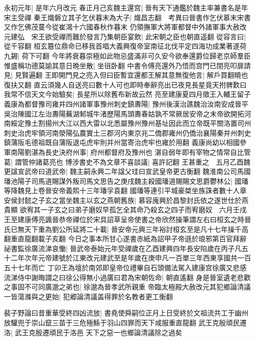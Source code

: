 永初元年|{
	是年六月改元}
春正月己亥魏主還宫|{
	晉有天下通鑑於魏主率兼書名是年宋主受禪}
秦王熾磐立其子乞伏暮末為大子|{
	熾昌志翻　考異曰晉書作乞伏慕末宋書又作乞佛茂蔓今從崔鴻十六國春秋作暮末}
仍領撫軍大將軍都督中外諸軍事大赦改元建弘　宋王欲受禪而難於發言乃集朝臣宴飲|{
	此宋朝之臣也朝直遥翻}
從容言曰|{
	從千容翻}
桓玄簒位鼎命已移我首唱大義興復帝室南征北伐平定四海功成業著遂荷九錫|{
	荷下可翻}
今年將衰暮崇極如此物忌盛滿非可久安今欲奉還爵位歸老京師羣臣惟盛稱功德莫諭其意日晩坐散|{
	坐徂卧翻}
中書令傅亮還外乃悟而宫門已閉亮叩扉請見|{
	見賢遍翻}
王即開門見之亮入但曰臣暫宜還都王解其意無復他言|{
	解戶買翻曉也復扶又翻}
直云須幾人自送亮曰數十人可也即時奉辭亮出已夜見長星竟天拊髀歎曰我常不信天文今始驗矣|{
	長星所以除舊布新故云然}
亮至建康夏四月徵王入輔王留子義康為都督豫司雍并四州諸軍事豫州刺史鎮夀陽|{
	豫州後漢治譙魏治汝南安成晉平吳治陳國江左治夀陽蕪湖邾城牛渚歷陽馬頭夀春姑孰不常厥居安帝之末帝欲開拓河南綏定豫土割揚州大江以西大雷以北悉屬豫州豫州基址因此而立帝既平關洛置司州刺史治虎牢領河南滎陽弘農實土三郡河内東京兆二僑郡雍州仍僑治襄陽秦并州刺史鎮蒲阪毛德祖既自蒲阪退屯虎牢則并州當寄治虎牢也雍於用翻}
義康尚幼以相國參軍南陽劉湛為長史決府州事|{
	府州都督府及豫州也}
湛自弱年即有宰物之情常自比管葛|{
	謂管仲諸葛亮也}
博涉書史不為文章不喜談議|{
	喜許記翻}
王甚重之　五月乙酉魏更諡宣武帝曰道武帝|{
	魏主嗣永興二年諡父珪曰宣武皇帝更古衡翻}
魏淮南公司馬國璠池陽子司馬道賜謀外叛司馬文思告之庚戌魏主殺國璠道賜賜文思爵鬱林公|{
	國璠等降魏見上卷晉安帝義熙十三年璠孚袁翻}
國璠等連引平城豪桀坐族誅者數十人章安侯封懿之子玄之當坐魏主以玄之燕朝舊族|{
	慕容廆興於昌黎封氏依之遂世仕於燕貴顯}
欲宥其一子玄之曰弟子磨奴早孤乞全其命乃殺玄之四子而宥磨奴　六月壬戌王至建康傅亮諷晉恭帝禪位於宋具詔草呈帝使書之帝欣然操筆謂左右曰桓玄之時晉氏已無天下重為劉公所延將二十載|{
	晉安帝元興三年裕討桓玄至是凡十七年操千高翻重直龍翻載子亥翻}
今日之事本所甘心遂書赤紙為詔甲子帝遜於琅邪第百官拜辭祕書監徐廣流涕哀慟|{
	晉武帝泰始元年受禪歲在乙酉建興四年長安陷歲在丙子凡五十二年次年元帝建號於江東改元建武至是年歲在庚申凡一百單三年西東享國共一百五十七年而亡}
丁卯王為壇於南郊即皇帝位禮畢自石頭備法駕入建康宫徐廣又悲感流涕侍中謝晦謂之曰徐公得無小過廣曰君為宋朝佐命|{
	朝直遙翻}
身是晉室遺老悲歡之事固不可同廣邈之弟也|{
	徐邈為晉孝武所親重}
帝臨太極殿大赦改元其犯鄉論清議一皆蕩滌與之更始|{
	犯郷論清議盖得罪於名教者更工衡翻}


裴子野論曰昔重華受終四凶流放|{
	書堯使舜嗣位正月上日受終於文祖流共工于幽州放驩兜于崇山竄三苗于三危殛鯀于羽山四罪而天下咸服重直龍翻}
武王克殷頑民遷洛|{
	武王克殷遷頑民于洛邑}
天下之惡一也鄉論清議除之過矣

